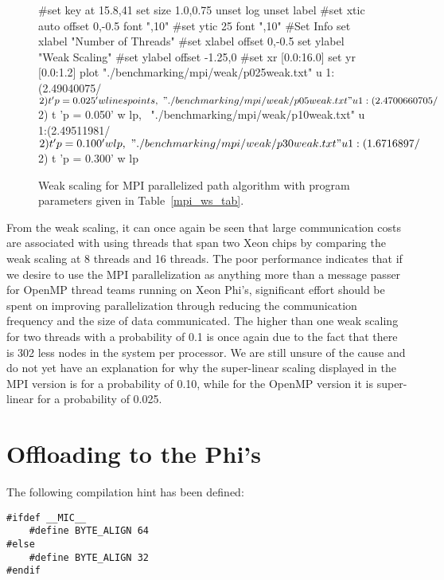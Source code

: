 \documentclass[11pt]{article}
\begin{document}
\begin{figure}[h]
	\begin{center}
		\begin{gnuplot}[terminal=cairolatex, terminaloptions= color] 
			#set key at 15.8,41
			set size 1.0,0.75              
			unset log                          
			unset label                          
			#set xtic auto offset 0,-0.5 font ",10"                     
			#set ytic 25 font ",10" 
			#Set Info
			set xlabel "Number of Threads"
			#set xlabel offset 0,-0.5
			set ylabel "Weak Scaling"
			#set ylabel offset -1.25,0
			#set xr [0.0:16.0]
			set yr [0.0:1.2]
			plot "./benchmarking/mpi/weak/p025weak.txt" u 1:(2.49040075/$2) t 'p = 0.025' w linespoints, \
			"./benchmarking/mpi/weak/p05weak.txt" u 1:(2.4700660705/$2) t 'p = 0.050' w lp, \
			"./benchmarking/mpi/weak/p10weak.txt" u 1:(2.49511981/$2) t 'p = 0.100' w lp, \
			"./benchmarking/mpi/weak/p30weak.txt" u 1:(1.6716897/$2) t 'p = 0.300' w lp
		\end{gnuplot}
		\caption{Weak scaling for MPI parallelized path algorithm with program parameters given in Table~\ref{mpi_ws_tab}.}
		\label{mpi_ws}
	\end{center}
\end{figure}
\noindent From the weak scaling, it can once again be seen that large communication costs are associated with using threads that span two Xeon chips by comparing the weak scaling at 8 threads and 16 threads. The poor performance indicates that if we desire to use the MPI parallelization as anything more than a message passer for OpenMP thread teams running on Xeon Phi's, significant effort should be spent on improving parallelization through reducing the communication frequency and the size of data communicated. The higher than one weak scaling for two threads with a probability of 0.1 is once again due to the fact that there is 302 less nodes in the system per processor. We are still unsure of the cause and do not yet have an explanation for why the super-linear scaling displayed in the MPI version is for a probability of 0.10, while for the OpenMP version it is super-linear for a probability of 0.025. 


\section{Offloading to the Phi's}

The following compilation hint has been defined:

\begin{lstlisting}
#ifdef __MIC__
    #define BYTE_ALIGN 64
#else
    #define BYTE_ALIGN 32
#endif
\end{lstlisting}
\end{document}
